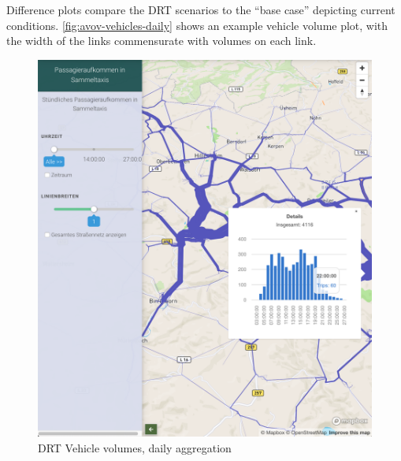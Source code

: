 Difference plots compare the DRT scenarios to the ``base case'' depicting current conditions. \autoref{fig:avov-vehicles-daily} shows an example vehicle volume plot, with the width of the links commensurate with volumes on each link.

\begin{figure}[ht]
  \centering
  \begin{minipage}[c]{0.45\textwidth}
     \includegraphics[width=\linewidth]{chapters/22-avov/images/fig-link-vols.png}
     \caption{DRT Vehicle volumes, daily aggregation }
     \label{fig:avov-vehicles-daily}
  \end{minipage}
  \begin{minipage}[c]{0.45\textwidth}

\end{minipage}
\end{figure}
